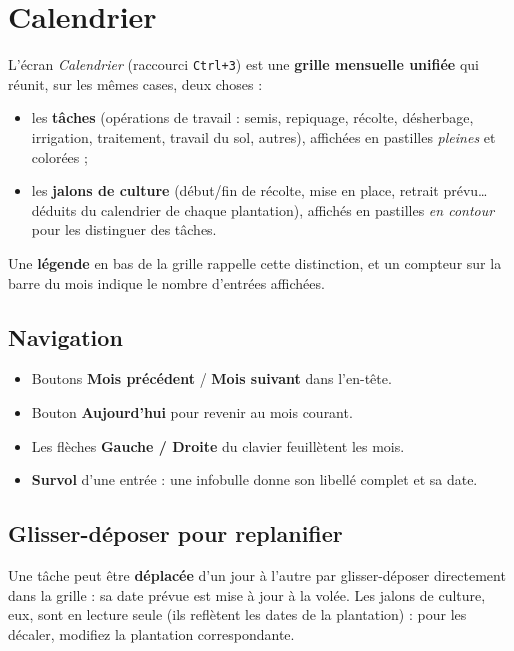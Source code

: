 \chapter{Calendrier}
\label{chap:calendrier}

L'écran \emph{Calendrier} (raccourci \texttt{Ctrl+3}) est une \textbf{grille mensuelle unifiée} qui réunit, sur les mêmes cases, deux choses :

\begin{itemize}
  \item les \textbf{tâches} (opérations de travail : semis, repiquage, récolte, désherbage, irrigation, traitement, travail du sol, autres), affichées en pastilles \emph{pleines} et colorées ;
  \item les \textbf{jalons de culture} (début/fin de récolte, mise en place, retrait prévu… déduits du calendrier de chaque plantation), affichés en pastilles \emph{en contour} pour les distinguer des tâches.
\end{itemize}

Une \textbf{légende} en bas de la grille rappelle cette distinction, et un compteur sur la barre du mois indique le nombre d'entrées affichées.

\section{Navigation}

\begin{itemize}
  \item Boutons \textbf{Mois précédent} / \textbf{Mois suivant} dans l'en-tête.
  \item Bouton \textbf{Aujourd'hui} pour revenir au mois courant.
  \item Les flèches \textbf{Gauche / Droite} du clavier feuillètent les mois.
  \item \textbf{Survol} d'une entrée : une infobulle donne son libellé complet et sa date.
\end{itemize}

\section{Glisser-déposer pour replanifier}

Une tâche peut être \textbf{déplacée} d'un jour à l'autre par glisser-déposer directement dans la grille : sa date prévue est mise à jour à la volée. Les jalons de culture, eux, sont en lecture seule (ils reflètent les dates de la plantation) : pour les décaler, modifiez la plantation correspondante.

